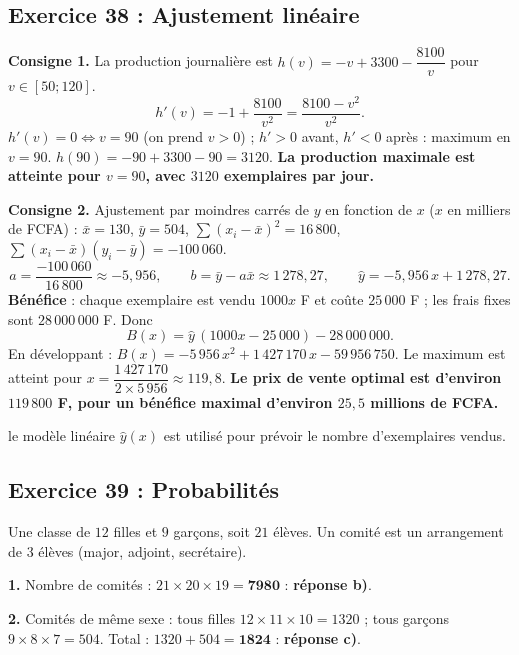 \subsection{Exercice 38 : Ajustement lin\'eaire}

\textbf{Consigne 1.} La production journali\`ere est $h(v)=-v+3300-\dfrac{8100}{v}$ pour $v\in[50;120]$.
\[
h'(v)=-1+\frac{8100}{v^2}=\frac{8100-v^2}{v^2}.
\]
$h'(v)=0\iff v=90$ (on prend $v>0$) ; $h'>0$ avant, $h'<0$ apr\`es : maximum en $v=90$.
$h(90)=-90+3300-90=3120$. \textbf{La production maximale est atteinte pour $v=90$, avec $3120$ exemplaires par jour.}

\medskip\noindent\textbf{Consigne 2.} Ajustement par moindres carr\'es de $y$ en fonction de $x$ ($x$ en milliers de FCFA) :
$\bar x=130$, $\bar y=504$, $\sum(x_i-\bar x)^2=16\,800$, $\sum(x_i-\bar x)(y_i-\bar y)=-100\,060$.
\[
a=\frac{-100\,060}{16\,800}\approx-5{,}956,\qquad b=\bar y-a\bar x\approx1\,278{,}27,\qquad \hat y=-5{,}956\,x+1\,278{,}27.
\]
\textbf{B\'en\'efice} : chaque exemplaire est vendu $1000x$ F et co\^ute $25\,000$ F ; les frais fixes sont $28\,000\,000$ F. Donc
\[
B(x)=\hat y\,(1000x-25\,000)-28\,000\,000.
\]
En d\'eveloppant : $B(x)=-5\,956\,x^2+1\,427\,170\,x-59\,956\,750$.
Le maximum est atteint pour $x=\dfrac{1\,427\,170}{2\times5\,956}\approx119{,}8$.
\textbf{Le prix de vente optimal est d'environ $119\,800$ F, pour un b\'en\'efice maximal d'environ $25{,}5$ millions de FCFA.}
\begin{hyp}le mod\`ele lin\'eaire $\hat y(x)$ est utilis\'e pour pr\'evoir le nombre d'exemplaires vendus.\end{hyp}

\subsection{Exercice 39 : Probabilit\'es}

Une classe de $12$ filles et $9$ gar\c cons, soit $21$ \'el\`eves. Un comit\'e est un arrangement de $3$ \'el\`eves
(major, adjoint, secr\'etaire).

\textbf{1.} Nombre de comit\'es : $21\times20\times19=\mathbf{7980}$ : \textbf{r\'eponse b)}.

\textbf{2.} Comit\'es de m\^eme sexe : tous filles $12\times11\times10=1320$ ; tous gar\c cons $9\times8\times7=504$.
Total : $1320+504=\mathbf{1824}$ : \textbf{r\'eponse c)}.

